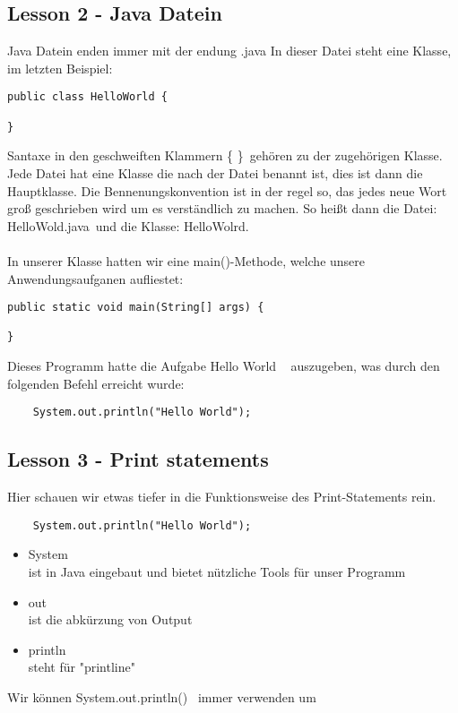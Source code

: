 \subsection{Lesson 2 - Java Datein}
Java Datein enden immer mit der endung \glqq .java \grqq
In dieser Datei steht eine Klasse, im letzten Beispiel: 

\begin{verbatim}
public class HelloWorld {
  
}
\end{verbatim}
Santaxe in den geschweiften Klammern \glqq \{ \}\grqq~gehören zu der zugehörigen Klasse.\\
Jede Datei hat eine Klasse die nach der Datei benannt ist, dies ist dann die Hauptklasse. Die Bennenungskonvention ist in der regel so, das jedes neue Wort groß geschrieben wird um es verständlich zu machen. So heißt dann die Datei: \glqq HelloWold.java\grqq~und die Klasse: \glqq HelloWolrd\grqq.\\~\\
In unserer Klasse hatten wir eine main()-Methode, welche unsere Anwendungsaufganen aufliestet:
\begin{verbatim}
public static void main(String[] args) {

}
\end{verbatim}

Dieses Programm hatte die Aufgabe \glqq Hello World \glqq~ auszugeben, was durch den folgenden Befehl erreicht wurde: 
\begin{verbatim}
    System.out.println("Hello World");
\end{verbatim}
\subsection{Lesson 3 - Print statements}
Hier schauen wir etwas tiefer in die Funktionsweise des Print-Statements rein.
\begin{verbatim}
    System.out.println("Hello World");
\end{verbatim}
\begin{itemize}
    \item System\\
    ist in Java eingebaut und bietet nützliche Tools für unser Programm
    \item out\\
    ist die abkürzung von Output
    \item println\\
    steht für "printline"
\end{itemize}
Wir können \glqq System.out.println() \grqq~immer verwenden um
